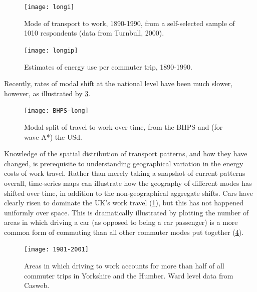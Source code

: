 \begin{figure}
 \centerline{\texttt{[image: longi]}}
 \caption[Mode of transport to work, 1890-1990]{Mode of
 transport to work, 1890-1990, from a self-selected sample of
1010 respondents (data from Turnbull, 2000).} \label{fturnmode}
\end{figure}

\begin{figure}
 \centerline{\texttt{[image: longip]}}
 \caption[Estimates of energy use per commuter trip, 1890-1990]
 {Estimates of energy use per commuter trip, 1890-1990.}
\label{flongip}
\end{figure}

Recently, rates of modal shift at the national level
have been much slower, however, as illustrated by \cref{fbhps}.
\begin{figure}[htbp]
    \texttt{[image: BHPS-long]}
  \caption[Modal split of travel to work over two decades]
  {Modal split of travel to work over time, from the BHPS and
  (for wave A*) the USd.} %
  \label{fbhps}
\end{figure} %
Knowledge of the spatial distribution of transport patterns, and how they have
changed, is prerequisite to understanding geographical variation in the energy
costs of work travel. Rather than merely taking a snapshot of current patterns
overall, time-series maps can illustrate how the geography of
different modes has shifted over time, in addition to the non-geographical
aggregate shifts.
Cars have clearly risen to dominate the
UK's work travel (\cref{fturnmode}), but this has not happened uniformly over
space. This is dramatically illustrated by plotting the number of areas in which
driving a car (as opposed to being a car passenger) is a more common form of
commuting than all other commuter modes put together (\cref{f1981}).

\begin{figure}[htbp]
  \centerline{
    \texttt{[image: 1981-2001]}}
  \caption[The growing dominance of the car, 1981 to 2001]
  {Areas in which driving to work accounts for more than half of all
  commuter trips in Yorkshire and the Humber. Ward level data from
  Casweb.} %
  \label{f1981}
\end{figure}

